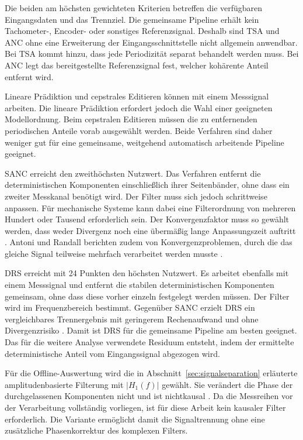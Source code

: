 Die beiden am höchsten gewichteten Kriterien betreffen die verfügbaren
Eingangsdaten und das Trennziel. Die gemeinsame Pipeline erhält kein
Tachometer-, Encoder- oder sonstiges Referenzsignal. Deshalb sind TSA und ANC
ohne eine Erweiterung der Eingangsschnittstelle nicht allgemein anwendbar.
Bei TSA kommt hinzu, dass jede Periodizität separat behandelt werden muss. Bei
ANC legt das bereitgestellte Referenzsignal fest, welcher kohärente Anteil
entfernt wird.

Lineare Prädiktion und cepstrales Editieren können mit einem Messsignal
arbeiten. Die lineare Prädiktion erfordert jedoch die Wahl einer geeigneten
Modellordnung. Beim cepstralen Editieren müssen die zu entfernenden
periodischen Anteile vorab ausgewählt werden. Beide Verfahren sind daher
weniger gut für eine gemeinsame, weitgehend automatisch arbeitende Pipeline
geeignet.

SANC erreicht den zweithöchsten Nutzwert. Das Verfahren entfernt die
deterministischen Komponenten einschließlich ihrer Seitenbänder, ohne dass ein
zweiter Messkanal benötigt wird. Der Filter muss sich jedoch schrittweise
anpassen. Für mechanische Systeme kann dabei eine Filterordnung von mehreren
Hundert oder Tausend erforderlich sein. Der Konvergenzfaktor muss so gewählt
werden, dass weder Divergenz noch eine übermäßig lange Anpassungszeit auftritt
\cite[S.~184--185, Abschn.~5.3.4]
{randallVibrationbasedConditionMonitoring2022}.
Antoni und Randall berichten zudem von Konvergenzproblemen, durch die das
gleiche Signal teilweise mehrfach verarbeitet werden musste
\cite[S.~104, Abschn.~1]
{antoniUnsupervisedNoiseCancellation2004}.

DRS erreicht mit 24 Punkten den höchsten Nutzwert. Es arbeitet ebenfalls mit
einem Messsignal und entfernt die stabilen deterministischen Komponenten
gemeinsam, ohne dass diese vorher einzeln festgelegt werden müssen. Der Filter
wird im Frequenzbereich bestimmt. Gegenüber SANC erzielt DRS ein vergleichbares
Trennergebnis mit geringerem Rechenaufwand und ohne Divergenzrisiko
\cites[S.~103--105, Abschn.~1--2]
{antoniUnsupervisedNoiseCancellation2004}
[S.~185--186, Abschn.~5.3.5]
{randallVibrationbasedConditionMonitoring2022}.
Damit ist DRS für die gemeinsame Pipeline am besten geeignet. Das für die
weitere Analyse verwendete Residuum entsteht, indem der ermittelte
deterministische Anteil vom Eingangssignal abgezogen wird.

Für die Offline-Auswertung wird die in Abschnitt~\ref{sec:signalseparation}
erläuterte amplitudenbasierte Filterung mit $\lvert H_1(f)\rvert$ gewählt.
Sie verändert die Phase der durchgelassenen Komponenten nicht und ist
nichtkausal
\cite[S.~15, Abschn.~5]{randallComparisonMethodsSeparation2011}.
Da die Messreihen vor der Verarbeitung vollständig vorliegen, ist für diese
Arbeit kein kausaler Filter erforderlich. Die Variante ermöglicht damit die
Signaltrennung ohne eine zusätzliche Phasenkorrektur des komplexen Filters.

